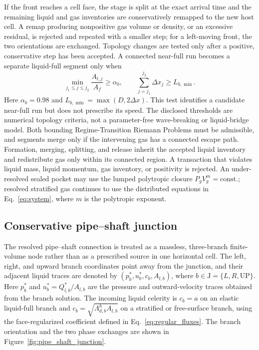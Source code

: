 If the front reaches a cell face, the stage is split at the exact arrival time
and the remaining liquid and gas inventories are conservatively remapped to the
new host cell. A remap producing nonpositive gas volume or density, or an
excessive residual, is rejected and repeated with a smaller step; for a
left-moving front, the two orientations are exchanged. Topology changes are
tested only after a positive, conservative step has been accepted. A connected
near-full run becomes a separate
liquid-full segment only when
\begin{equation}
\min_{j_1\le j\le j_2}\frac{A_{l,j}}{A_f}\ge\alpha_b,
\qquad
\sum_{j=j_1}^{j_2}\Delta x_j\ge L_{b,\min}.
\label{eq:topology_criterion}
\end{equation}
Here $\alpha_b=0.98$ and $L_{b,\min}=\max(D,2\Delta x)$. This test identifies
a candidate near-full run but does not prescribe its
speed. The disclosed thresholds are numerical topology criteria, not a
parameter-free wave-breaking or liquid-bridge model. Both bounding
Regime-Transition Riemann Problems must be admissible, and segments merge only
if the intervening gas has a connected escape path.
Formation, merging, splitting, and release inherit the accepted liquid
inventory and redistribute gas only within its connected region. A transaction
that violates liquid mass, liquid momentum, gas inventory, or positivity is
rejected. An under-resolved sealed pocket may use the lumped polytropic closure
$P_gV_g^m=\mathrm{const.}$; resolved stratified gas continues to use the
distributed equations in Eq.~\eqref{eq:system}, where $m$ is the polytropic
exponent.

\subsection{Conservative pipe--shaft junction}
\label{sec:model:junction}
\label{sec:model:riser}

The resolved pipe--shaft connection is treated as a massless, three-branch
finite-volume node rather than as a prescribed source in one horizontal cell.
The left, right, and upward branch coordinates point away from the junction,
and their adjacent liquid traces are denoted by
$(p_b^*,u_b^*,c_b,A_{l,b})$, where
$b\in\mathrm{J}=\{L,R,\mathrm{UP}\}$.
Here $p_b^*$ and $u_b^*=Q_{l,b}^*/A_{l,b}$ are the pressure and outward-velocity
traces obtained from the branch solution.  The incoming liquid celerity is
$c_b=a$ on an elastic liquid-full branch and
$c_b=\sqrt{\Lambda_{d,b}^{h}A_{l,b}}$ on a stratified or free-surface branch,
using the face-regularized coefficient defined in Eq.~\eqref{eq:regular_fluxes}.
The branch orientation and the two phase exchanges are shown in
Figure~\ref{fig:pipe_shaft_junction}.

